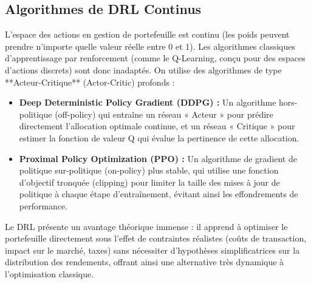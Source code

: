 \subsection{Algorithmes de DRL Continus}
L'espace des actions en gestion de portefeuille est continu (les poids peuvent prendre n'importe quelle valeur réelle entre 0 et 1). Les algorithmes classiques d'apprentissage par renforcement (comme le Q-Learning, conçu pour des espaces d'actions discrets) sont donc inadaptés. On utilise des algorithmes de type **Acteur-Critique** (Actor-Critic) profonds :
\begin{itemize}
    \item \textbf{Deep Deterministic Policy Gradient (DDPG) :} Un algorithme hors-politique (off-policy) qui entraîne un réseau « Acteur » pour prédire directement l'allocation optimale continue, et un réseau « Critique » pour estimer la fonction de valeur Q qui évalue la pertinence de cette allocation.
    \item \textbf{Proximal Policy Optimization (PPO) :} Un algorithme de gradient de politique sur-politique (on-policy) plus stable, qui utilise une fonction d'objectif tronquée (clipping) pour limiter la taille des mises à jour de politique à chaque étape d'entraînement, évitant ainsi les effondrements de performance.
\end{itemize}

Le DRL présente un avantage théorique immense : il apprend à optimiser le portefeuille directement sous l'effet de contraintes réalistes (coûts de transaction, impact sur le marché, taxes) sans nécessiter d'hypothèses simplificatrices sur la distribution des rendements, offrant ainsi une alternative très dynamique à l'optimisation classique.

